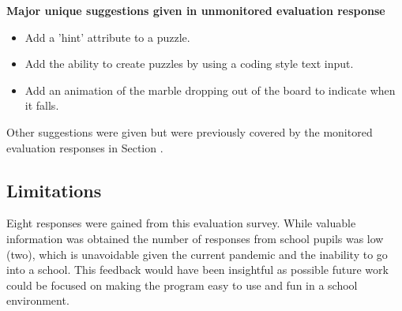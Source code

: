 \documentclass{l4proj}
\begin{document}
\textbf{Major unique suggestions given in unmonitored evaluation response}
\begin{itemize}
    \item Add a 'hint' attribute to a puzzle.
    \item Add the ability to create puzzles by using a coding style text input.
    \item Add an animation of the marble dropping out of the board to indicate when it falls.
\end{itemize}


Other suggestions were given but were previously covered by the monitored evaluation responses in Section .

\subsection{Limitations}


Eight responses were gained from this evaluation survey. While valuable information was obtained the number of responses from school pupils was low (two), which is unavoidable given the current pandemic and the inability to go into a school. This feedback would have been insightful as possible future work could be focused on making the program easy to use and fun in a school environment.  
\end{document}
